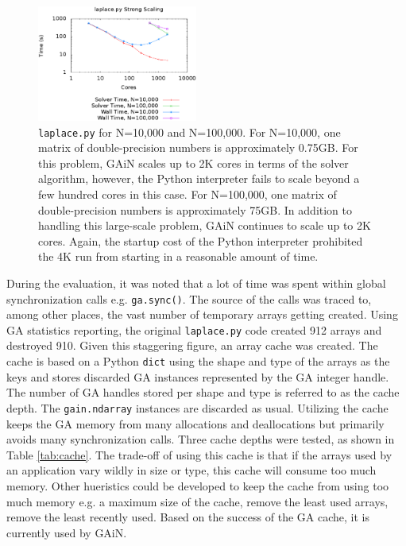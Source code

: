 \documentclass{sigplanconf}
\begin{document}
\begin{figure}[htb]
\centering
\includegraphics[width=0.47\textwidth]{laplace.eps}
\caption{
\texttt{laplace.py} for N=10,000 and N=100,000. For N=10,000, one matrix
of double-precision numbers is approximately 0.75GB. For this problem, GAiN
scales up to 2K cores in terms of the solver algorithm, however, the Python
interpreter fails to scale beyond a few hundred cores in this case. For
N=100,000, one matrix of double-precision numbers is approximately 75GB. In
addition to handling this large-scale problem, GAiN continues to scale up to
2K cores. Again, the startup cost of the Python interpreter prohibited the 4K
run from starting in a reasonable amount of time.
}
\label{fig:laplace}
\end{figure}

During the evaluation, it was noted that a lot of time was spent within global
synchronization calls e.g. \verb=ga.sync()=. The source of the calls was
traced to, among other places, the vast number of temporary arrays getting
created.  Using GA statistics reporting, the original \verb=laplace.py= code
created 912 arrays and destroyed 910. Given this staggering figure, an array
cache was created. The cache is based on a Python \verb=dict= using the shape
and type of the arrays as the keys and stores discarded GA instances
represented by the GA integer handle. The number of GA handles stored per
shape and type is referred to as the cache depth. The \verb=gain.ndarray=
instances are discarded as usual.  Utilizing the cache keeps the GA memory
from many allocations and deallocations but primarily avoids many
synchronization calls. Three cache depths were tested, as shown in Table
\ref{tab:cache}. The trade-off of using this cache is that if the arrays used
by an application vary wildly in size or type, this cache will consume too
much memory. Other hueristics could be developed to keep the cache from using
too much memory e.g. a maximum size of the cache, remove the least used
arrays, remove the least recently used.  Based on the success of the GA cache,
it is currently used by GAiN.
\end{document}
